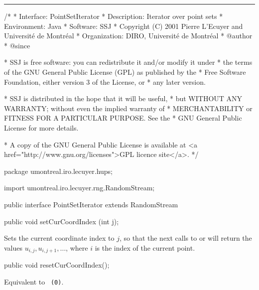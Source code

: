 \bigskip\hrule\bigskip

\begin{code}
\begin{hide}
/*
 * Interface:    PointSetIterator
 * Description:  Iterator over point sets
 * Environment:  Java
 * Software:     SSJ 
 * Copyright (C) 2001  Pierre L'Ecuyer and Université de Montréal
 * Organization: DIRO, Université de Montréal
 * @author       
 * @since

 * SSJ is free software: you can redistribute it and/or modify it under
 * the terms of the GNU General Public License (GPL) as published by the
 * Free Software Foundation, either version 3 of the License, or
 * any later version.

 * SSJ is distributed in the hope that it will be useful,
 * but WITHOUT ANY WARRANTY; without even the implied warranty of
 * MERCHANTABILITY or FITNESS FOR A PARTICULAR PURPOSE.  See the
 * GNU General Public License for more details.

 * A copy of the GNU General Public License is available at
   <a href="http://www.gnu.org/licenses">GPL licence site</a>.
 */
\end{hide}
package umontreal.iro.lecuyer.hups;\begin{hide}

import umontreal.iro.lecuyer.rng.RandomStream;\end{hide}

public interface PointSetIterator extends RandomStream\begin{hide} {\end{hide}

   public void setCurCoordIndex (int j);
\end{code}
 \begin{tabb}
   Sets the current coordinate index to $j$, so that 
   the next calls to  or  
   will return the values $u_{i,j}, u_{i,j+1}, \dots$, where $i$ is the
   index of the current point.
 \end{tabb}
\begin{htmlonly}
\end{htmlonly}
\begin{code}

   public void resetCurCoordIndex();
\end{code}
 \begin{tabb}
  Equivalent to ~\texttt{(0)}.
 \end{tabb}

